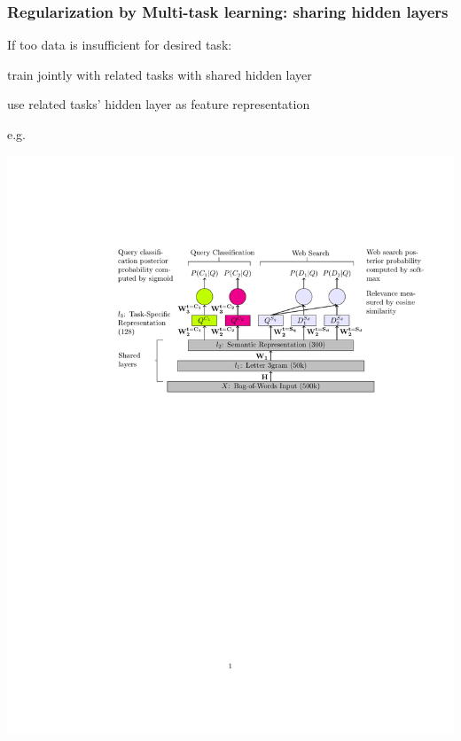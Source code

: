 \begin{frame}
\frametitle{Regularization by Multi-task learning: sharing hidden layers }
\bi
\item If too data is insufficient for desired task: 
\be
	\item train jointly with related tasks with shared hidden layer
	\item use related tasks' hidden layer as feature representation
\ee
\item e.g. \cite{liu15multitask}
\ei
\centerline{\includegraphics[scale=0.7]{figs/liu15multitask_mtdnn_arch}}
\end{frame}

